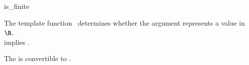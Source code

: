 \begin{ccRefFunction}{is_finite}

\ccDefinition

The template function \ccRefName\ determines whether the argument represents 
a value in $\R$.\\

 implies .

\ccRefines 


        { The  is convertible to . }

\ccSeeAlso
{} \\
\\
 
\end{ccRefFunction}